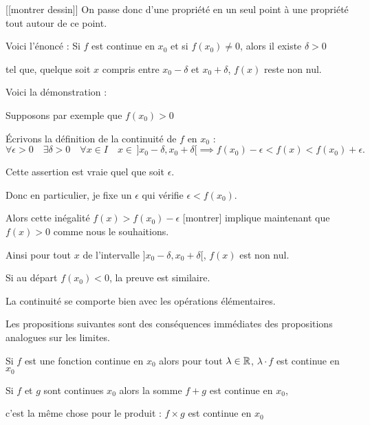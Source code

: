 \change 

[[montrer dessin]]
On passe donc d'une propriété en un seul point à une propriété 
tout autour de ce point.

Voici l'énoncé :
Si $f$ est continue en $x_0$ et si $f(x_0)\neq 0$, alors il existe $\delta>0$

tel que, quelque soit $x$ compris entre $x_0-\delta$ et $x_0+\delta$,
$f(x)$ reste non nul.

\change

Voici la démonstration :

Supposons par exemple que $f(x_0)>0$

\change

\'Ecrivons la définition de la continuité de $f$ en $x_0$ :
\[
\forall \epsilon>0 \quad \exists \delta>0 \quad \forall x\in I \quad  x\in \, ]x_0-\delta,x_0+\delta [
\implies f(x_0)-\epsilon < f(x) <f(x_0)+\epsilon.
\]

\change

Cette assertion est vraie quel que soit $\epsilon$.

Donc en particulier, je fixe un $\epsilon$ qui vérifie  $\epsilon<f(x_0)$. 

\change

Alors cette inégalité $f(x)>f(x_0)-\epsilon$ [montrer]
implique maintenant que $f(x) > 0$ comme nous le souhaitions.

Ainsi pour tout $x$ de l'intervalle $]x_0-\delta,x_0+\delta [$,
$f(x)$ est non nul.

Si au départ $f(x_0)<0$, la preuve est similaire.


\diapo


La continuité se comporte bien avec les opérations élémentaires. 

Les propositions suivantes sont des conséquences immédiates des propositions analogues sur les limites.

\change

Si $f$ est une fonction continue en $x_0$ alors 
pour tout $\lambda\in\mathbb{R}$, $\lambda\cdot f$ est continue en $x_0$ 

\change

Si  $f$ et $g$ sont continues $x_0$ alors
la somme $f+g$ est continue en $x_0$,
 
 \change
 
 c'est la même chose pour le produit :  $f\times g$ est continue en $x_0$

 
 \change
 
